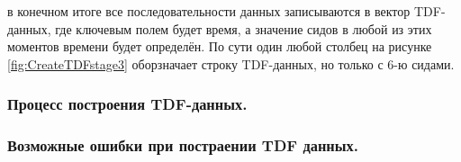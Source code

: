 {  \par в конечном итоге все последовательности данных записываются в вектор TDF-данных, где ключевым полем будет время, а значение сидов в любой из этих моментов времени будет определён. По сути один любой столбец на рисунке \ref{fig:CreateTDFstage3} оборзначает строку TDF-данных, но только с 6-ю сидами. 

}

\subsubsection{ \standartTitleFont
  Процесс построения TDF-данных.
} \label{subsubsec:CreateTDFProc}

{\standartFont

  \par 

}

\subsubsection{ \standartTitleFont
  Возможные ошибки при постраении TDF данных.
} \label{subsubsec:CreateTDFErr}

{\standartFont

  \par 

}
